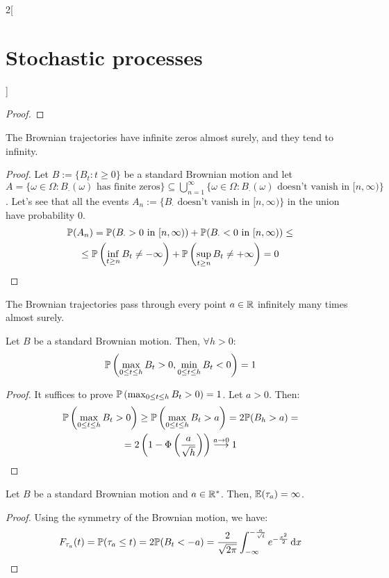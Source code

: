 \documentclass[../../../main_math.tex]{subfiles}
\begin{document}
\begin{multicols}{2}[\section{Stochastic processes}]
\begin{proof}
  \end{proof}
  \begin{corollary}
    The Brownian trajectories have infinite zeros almost surely, and they tend to infinity.
  \end{corollary}
  \begin{proof}
    Let $B:=\{B_t:t\geq 0\}$ be a standard Brownian motion and let $A=\{\omega\in\Omega:B_{\cdot}(\omega)\text{ has finite zeros}\}\subseteq \bigcup_{n=1}^\infty\{\omega\in\Omega:B_{\cdot}(\omega)\text{ doesn't vanish in $[n,\infty)$}\}$. Let's see that all the events $A_n:=\{B_{\cdot}\text{ doesn't vanish in $[n,\infty)$}\}$ in the union have probability 0.
    \begin{multline*}
      \mathbb{P}(A_n)=\mathbb{P}(B_{\cdot}>0\text{ in $[n,\infty)$})+\mathbb{P}(B_{\cdot}<0\text{ in $[n,\infty)$})\leq\\\leq \mathbb{P}\left(\inf_{t\geq n}B_t\ne-\infty\right)+\mathbb{P}\left(\sup_{t\geq n}B_t\ne+\infty\right)=0
    \end{multline*}
  \end{proof}
  \begin{corollary}
    The Brownian trajectories pass through every point $a\in\mathbb{R}$ infinitely many times almost surely.
  \end{corollary}
  \begin{proposition}
    Let $B$ be a standard Brownian motion. Then, $\forall h>0$:
    $$
      \mathbb{P}\left(\max_{0\leq t\leq h}B_t>0,\min_{0\leq t\leq h}B_t<0\right)=1
    $$
  \end{proposition}
  \begin{proof}
    It suffices to prove $\mathbb{P}\left(\max_{0\leq t\leq h}B_t>0\right)=1$. Let $a>0$. Then:
    \begin{multline*}
      \mathbb{P}\left(\max_{0\leq t\leq h}B_t>0\right)\geq \mathbb{P}\left(\max_{0\leq t\leq h}B_t>a\right) =2\mathbb{P}(B_h>a)=\\=2\left(1-\Phi\left(\frac{a}{\sqrt{h}}\right)\right)\overset{a\to 0}{\longrightarrow} 1
    \end{multline*}
  \end{proof}
  \begin{proposition}
    Let $B$ be a standard Brownian motion and $a\in\mathbb{R}^*$. Then, $\mathbb{E}(\tau_a)=\infty$.
  \end{proposition}
  \begin{proof}
    Using the symmetry of the Brownian motion, we have:
    $$
      F_{\tau_a}(t)=\mathbb{P}(\tau_a\leq t) =2\mathbb{P}(B_t<-a) =\frac{2}{\sqrt{2\pi}}\int_{-\infty}^{-\frac{a}{\sqrt{t}}} e^{-\frac{x^2}{2}}\dd{x}
$$
\end{proof}
\end{multicols}
\end{document}
